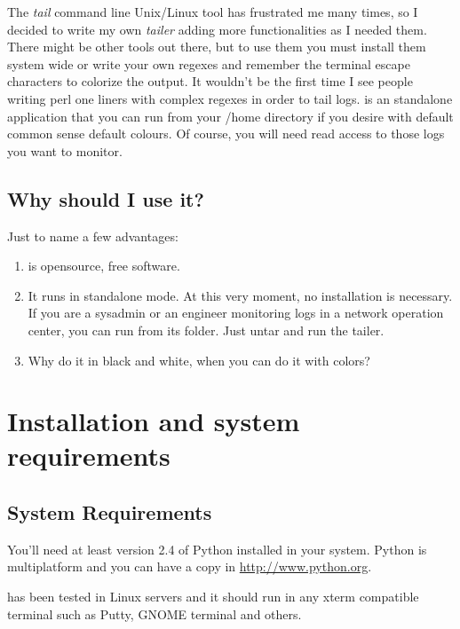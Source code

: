 The \emph{tail} command line Unix/Linux tool has frustrated me many times, so I decided 
to write my own \emph{tailer} adding more functionalities as I needed them. There might be 
other tools out there, but to use them you must install them system wide or 
write your own regexes and remember the terminal escape characters to colorize the 
output. It wouldn't be the first time I see people writing perl one liners with complex regexes in order 
to tail logs. \logftailer{} is an 
standalone application that you can run from your /home directory if you desire with default common sense 
default colours.
Of course, you will need read access to those logs you want to monitor.  

\subsection{Why should I use it?}
Just to name a few advantages:

\begin{enumerate}
    \item \logftailer{} is opensource, free software.
    \item It runs in standalone mode.
At this very moment, no installation is necessary. 
If you are a sysadmin or an engineer monitoring logs in a network operation center, 
you can run \logftailer{} from its folder. Just untar and run the tailer. 

    \item Why do it in black and white, when you can do it with colors?

\end{enumerate}

\section{Installation and system requirements}

\subsection{System Requirements}

You'll need at least version 2.4 of Python installed in your system. 
Python is multiplatform and you can have a copy in \href{http://www.python.org}{http://www.python.org}.  

\logftailer{} has been tested in Linux servers and it should run in any xterm compatible terminal 
such as Putty, GNOME terminal and others.

